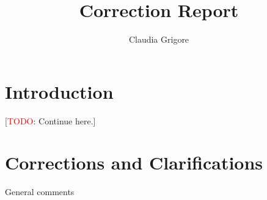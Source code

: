 \documentclass{article}
\title{Correction Report}
\author{Claudia Grigore}
\newcommand{\todo}[1]{[\textcolor{red}{TODO}: #1]}
\newenvironment{them}{\noindent\begingroup\color{blue}}{\endgroup\par}
\begin{document}
\maketitle

\section{Introduction}

\todo{Continue here.}
\section{Corrections and Clarifications}

\begin{them}
General comments
\end{them}
\end{document}
